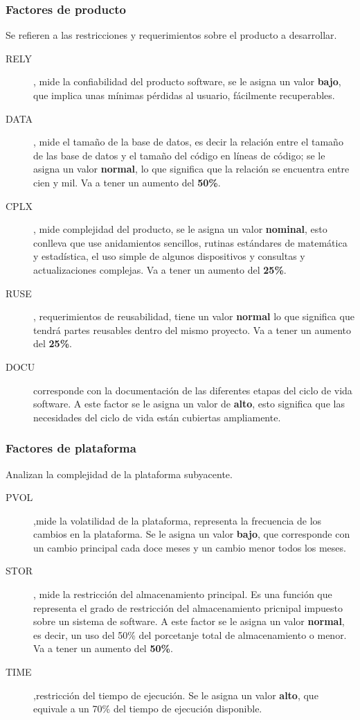 \documentclass[11pt,a4paper,spanish,twoside]{book}
\begin{document}
\subsubsection{Factores de producto}
Se refieren a las restricciones y requerimientos sobre el producto a
desarrollar.
\begin{description}
\item[RELY], mide la confiabilidad del producto software, se le asigna un 
valor \textbf{bajo}, que implica unas mínimas pérdidas al usuario,
fácilmente recuperables.

\item[DATA], mide el tamaño de la base de datos, es decir la relación entre
el tamaño de las base de datos y el tamaño del código en líneas de código; se
le asigna un valor \textbf{normal}, lo que significa que la relación se encuentra entre cien y mil. Va a tener un aumento del \textbf{50\%}.

\item[CPLX], mide complejidad del producto, se le asigna un
valor \textbf{nominal}, esto conlleva que use anidamientos sencillos, rutinas
estándares de matemática y estadística, el uso simple de algunos dispositivos
y consultas y actualizaciones complejas. Va a tener un aumento del 
\textbf{25\%}.

\item[RUSE], requerimientos de reusabilidad, tiene un valor \textbf{normal}
lo que significa que tendrá partes reusables dentro del mismo
proyecto. Va a tener un aumento del \textbf{25\%}.

\item[DOCU] corresponde con la documentación de las diferentes etapas del
ciclo de vida software. A este factor se le asigna un valor de \textbf{alto},
esto significa que las necesidades del ciclo de vida están cubiertas
ampliamente.

\end{description}

\subsubsection{Factores de plataforma}
Analizan la complejidad de la plataforma subyacente.
\begin{description}
\item[PVOL],mide la volatilidad de la plataforma, representa la frecuencia de
  los cambios en la plataforma. Se le asigna un valor \textbf{bajo}, que
  corresponde con un cambio principal cada doce meses y un cambio menor todos
  los meses.

\item[STOR], mide la restricción del almacenamiento principal. Es una función
  que representa el grado de restricción del almacenamiento pricnipal
  impuesto sobre un sistema de software. A este factor se le asigna un valor
  \textbf{normal}, es decir, un uso del 50\% del porcetanje total de
  almacenamiento o menor. Va a tener un aumento del \textbf{50\%}.

\item[TIME],restricción del tiempo de ejecución. Se le asigna un valor
  \textbf{alto}, que equivale a un 70\% del tiempo de ejecución disponible.
\end{description}
\end{document}
